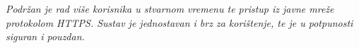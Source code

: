 		\textit{Podržan je rad više korisnika u stvarnom vremenu te pristup iz javne mreže protokolom HTTPS. Sustav je jednostavan i brz za korištenje, te je u potpunosti siguran i pouzdan.}

		\eject
		
